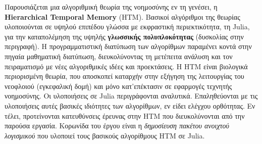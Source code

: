 \thispagestyle{empty}
\begin{center}
   \Large
   \textbf{\titlestring}

   \vspace{0.4cm}
   \large

   \vspace{0.4cm}
   \textbf{\authorstring}

   \vspace{0.9cm}
   \textbf{\abstractname}
\end{center}

    Παρουσιάζεται μια αλγοριθμική θεωρία της νοημοσύνης εν τη γενέσει, η \textbf{Hierarchical Temporal Memory} (HTM).
    Βασικοί αλγόριθμοι της θεωρίας υλοποιούνται σε υψηλού επιπέδου γλώσσα με εκφραστική περιεκτικότητα, τη Julia,
    για την καταπολέμηση της υψηλής \textbf{γλωσσικής πολυπλοκότητας} (δυσκολίας στην περιγραφή).
    Η προγραμματιστική διατύπωση των αλγορίθμων παραμένει κοντά στην πηγαία μαθηματική διατύπωση,
    διευκολύνοντας τη μετέπειτα ανάλυση και τον πειραματισμό με νέες αλγοριθμικές ιδέες και προεκτάσεις.
    Η HTM είναι βιολογικά περιορισμένη θεωρία, που αποσκοπεί καταρχήν στην εξήγηση της λειτουργίας του νεοφλοιού (εγκεφαλική δομή)
    και μόνο κατ'επέκτασιν σε εφαρμογές τεχνητής νοημοσύνης.
    Οι υλοποιήσεις σε Julia περιγράφονται αναλυτικά.
    Επαληθεύονται με τις υλοποιήσεις αυτές βασικές ιδιότητες των αλγορίθμων, εν είδει ελέγχου ορθότητας.
    Εν τέλει, προτείνονται κατευθύνσεις έρευνας στην HTM που διευκολύνονται από την παρούσα εργασία.
    Κορωνίδα του έργου είναι η \textit{δημοσίευση πακέτου ανοιχτού λογισμικού} που υλοποιεί τους βασικούς αλγορίθμους HTM σε Julia.

